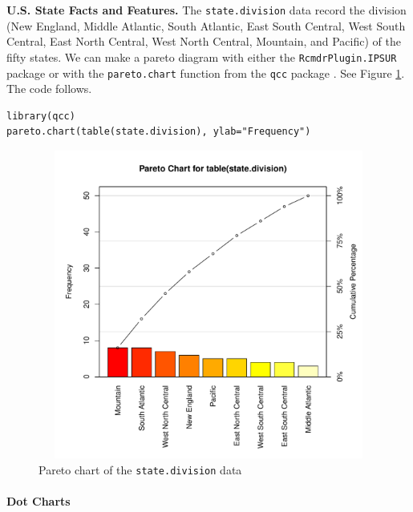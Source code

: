 \documentclass[captions=tableheading]{scrbook}
\begin{document}
\begin{example}
\textbf{U.S. State Facts and Features.} The \texttt{state.division} data record the division (New England, Middle Atlantic, South Atlantic, East South Central, West South Central, East North Central, West North Central, Mountain, and Pacific) of the fifty states. We can make a pareto diagram with either the \texttt{RcmdrPlugin.IPSUR} package or with the \texttt{pareto.chart} function from the \texttt{qcc} package \cite{qcc}. See Figure \ref{fig:Pareto-chart}. The code follows.



\begin{verbatim}
library(qcc)
pareto.chart(table(state.division), ylab="Frequency")
\end{verbatim}



\begin{figure}[th]
    \includegraphics[width=5in, height=4in]{img/Pareto-chart.pdf}
    \caption{Pareto chart of the \texttt{state.division} data}
    \label{fig:Pareto-chart}
  \end{figure}

\end{example}



\paragraph*{Dot Charts}
\label{par:Dotcharts}
\end{document}
